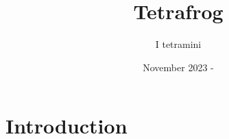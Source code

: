 \documentclass{article}
\begin{document}
\title{Tetrafrog}
\author{I tetramini}
\date{November 2023 - }
\maketitle

\section{Introduction}
\end{document}
